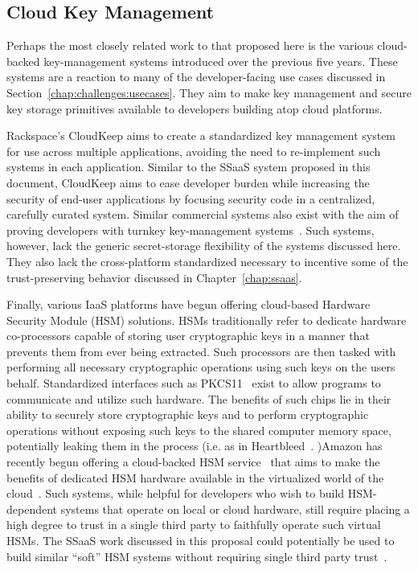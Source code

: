 \subsection{Cloud Key Management}

Perhaps the most closely related work to that proposed here is the
various cloud-backed key-management systems introduced over the
previous five years. These systems are a reaction to many of the
developer-facing use cases discussed in
Section~\ref{chap:challenges:usecases}. They aim to make key
management and secure key storage primitives available to developers
building atop cloud platforms.

Rackspace's CloudKeep\cite{cloudkeep-presentation, cloudkeep} aims to
create a standardized key management system for use across multiple
applications, avoiding the need to re-implement such systems in each
application. Similar to the SSaaS system proposed in this document,
CloudKeep aims to ease developer burden while increasing the security
of end-user applications by focusing security code in a centralized,
carefully curated system. Similar commercial systems also exist with
the aim of proving developers with turnkey key-management
systems~\cite{gazzang, porticor, rosen2012}. Such systems, however,
lack the generic secret-storage flexibility of the systems discussed
here. They also lack the cross-platform standardized necessary to
incentive some of the trust-preserving behavior discussed in
Chapter~\ref{chap:ssaas}.

Finally, various IaaS platforms have begun offering cloud-based
Hardware Security Module (HSM) solutions. HSMs traditionally refer to
dedicate hardware co-processors capable of storing user cryptographic
keys in a manner that prevents them from ever being extracted. Such
processors are then tasked with performing all necessary cryptographic
operations using such keys on the users behalf. Standardized
interfaces such as PKCS11~\cite{pcks11-standard} exist to allow
programs to communicate and utilize such hardware. The benefits of
such chips lie in their ability to securely store cryptographic keys
and to perform cryptographic operations without exposing such keys to
the shared computer memory space, potentially leaking them in the
process (i.e. as in Heartbleed~\cite{heartbleed}. )Amazon has recently
begun offering a cloud-backed HSM service~\cite{lorier-pkcs11} that
aims to make the benefits of dedicated HSM hardware available in the
virtualized world of the cloud~\cite{amazon-hsm}. Such systems, while
helpful for developers who wish to build HSM-dependent systems that
operate on local or cloud hardware, still require placing a high
degree to trust in a single third party to faithfully operate such
virtual HSMs. The SSaaS work discussed in this proposal could
potentially be used to build similar ``soft'' HSM systems without
requiring single third party trust~\cite{lorier-pkcs11}.

